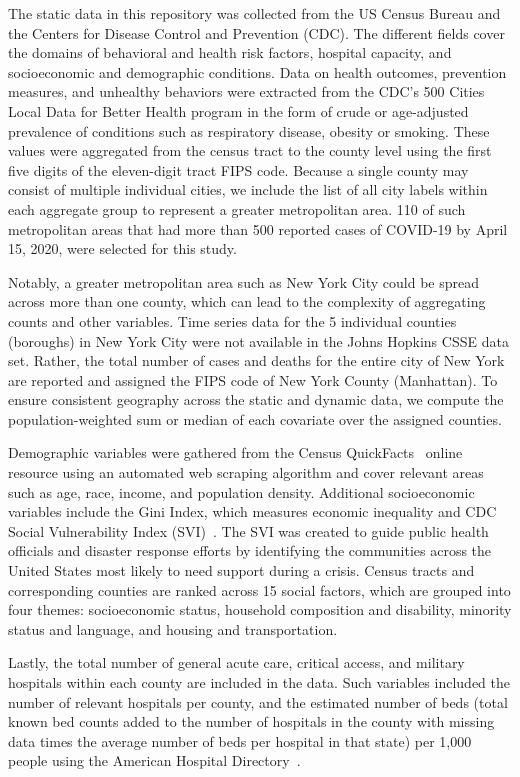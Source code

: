 \documentclass[12pt]{article}
\theoremstyle{definition}
\renewcommand{\_}{%
    \textunderscore\hspace{0pt}%
}
\begin{document}
The static data in this repository was collected from the US Census Bureau and the Centers for Disease Control and Prevention (CDC). The different fields cover the domains of behavioral and health risk factors, hospital capacity, and socioeconomic and demographic conditions. Data on health outcomes, prevention measures, and unhealthy behaviors were extracted from the CDC's 500 Cities Local Data for Better Health program \cite{www-cdc-chronic-data} in the form of crude or age-adjusted prevalence of conditions such as respiratory disease, obesity or smoking. These values were aggregated from the census tract to the county level using the first five digits of the eleven-digit tract FIPS code. Because a single county may consist of multiple individual cities, we include the list of all city labels within each aggregate group to represent a greater metropolitan area. 110 of such metropolitan areas that had more than 500 reported cases of COVID-19 by April 15, 2020, were selected for this study.

Notably, a greater metropolitan area such as New York City could be spread across more than one county, which can lead to the complexity of aggregating counts and other variables. Time series data for the 5 individual counties (boroughs) in New York City were not available in the Johns Hopkins CSSE data set. Rather, the total number of cases and deaths for the entire city of New York are reported and assigned the FIPS code of New York County (Manhattan). To ensure consistent geography across the static and dynamic data, we compute the population-weighted sum or median of each covariate over the assigned counties.

Demographic variables were gathered from the Census QuickFacts~\cite{www-census} online resource using an automated web scraping algorithm and cover relevant areas such as age, race, income, and population density. Additional socioeconomic variables include the Gini Index, which measures economic inequality and CDC Social Vulnerability Index (SVI)~\cite{www-cdc-svi}. The SVI was created to guide public health officials and disaster response efforts by identifying the communities across the United States most likely to need support during a crisis. Census tracts and corresponding counties are ranked across 15 social factors, which are grouped into four themes: socioeconomic status, household composition and disability, minority status and language, and housing and transportation.

Lastly, the total number of general acute care, critical access, and military hospitals within each county are included in the data. Such variables included the number of relevant hospitals per county, and the estimated number of beds (total known bed counts added to the number of hospitals in the county with missing data times the average number of beds per hospital in that state) per 1,000 people using the American Hospital Directory~\cite{www-ahd}.
\end{document}
